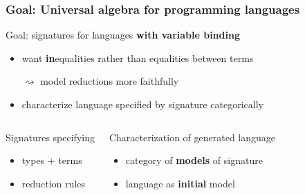 \documentclass[
serif,
mathsans,
]
{beamer}
\begin{document}
\begin{frame}
 \frametitle{Goal: Universal algebra for programming languages}
  
   \begin{block}{Goal: signatures for languages \textbf{with variable binding}}
    \begin{itemize}
     \item want \textbf{in}equalities rather than equalities between terms
     \item [$\rightsquigarrow$] model reductions more faithfully
     \item characterize language specified by signature categorically
    \end{itemize}

  \end{block}
  
 \begin{columns}
  
  \begin{block}{Signatures specifying}
      \begin{itemize}
        \item types + 
                    terms
        \item reduction rules
      \end{itemize}
  \end{block}
  
  \begin{block}{Characterization of generated language}
      \begin{itemize}
         \item category of \textbf{models} of signature
        \item language as \textbf{initial} model %
      \end{itemize}
  \end{block}
\end{columns}
\end{frame}
\end{document}
